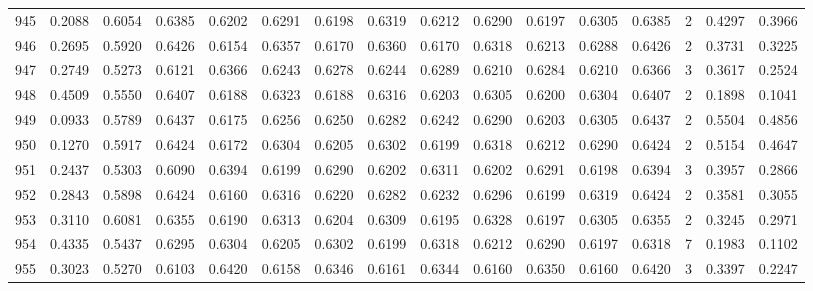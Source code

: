\begin{tabular}{lrrrrrrrrrrrrrrr}
945 &      0.2088 &  0.6054 &  0.6385 &  0.6202 &  0.6291 &  0.6198 &  0.6319 &  0.6212 &  0.6290 &  0.6197 &   0.6305 &     0.6385 &      2 &                    0.4297 &                     0.3966 \\
946 &      0.2695 &  0.5920 &  0.6426 &  0.6154 &  0.6357 &  0.6170 &  0.6360 &  0.6170 &  0.6318 &  0.6213 &   0.6288 &     0.6426 &      2 &                    0.3731 &                     0.3225 \\
947 &      0.2749 &  0.5273 &  0.6121 &  0.6366 &  0.6243 &  0.6278 &  0.6244 &  0.6289 &  0.6210 &  0.6284 &   0.6210 &     0.6366 &      3 &                    0.3617 &                     0.2524 \\
948 &      0.4509 &  0.5550 &  0.6407 &  0.6188 &  0.6323 &  0.6188 &  0.6316 &  0.6203 &  0.6305 &  0.6200 &   0.6304 &     0.6407 &      2 &                    0.1898 &                     0.1041 \\
949 &      0.0933 &  0.5789 &  0.6437 &  0.6175 &  0.6256 &  0.6250 &  0.6282 &  0.6242 &  0.6290 &  0.6203 &   0.6305 &     0.6437 &      2 &                    0.5504 &                     0.4856 \\
950 &      0.1270 &  0.5917 &  0.6424 &  0.6172 &  0.6304 &  0.6205 &  0.6302 &  0.6199 &  0.6318 &  0.6212 &   0.6290 &     0.6424 &      2 &                    0.5154 &                     0.4647 \\
951 &      0.2437 &  0.5303 &  0.6090 &  0.6394 &  0.6199 &  0.6290 &  0.6202 &  0.6311 &  0.6202 &  0.6291 &   0.6198 &     0.6394 &      3 &                    0.3957 &                     0.2866 \\
952 &      0.2843 &  0.5898 &  0.6424 &  0.6160 &  0.6316 &  0.6220 &  0.6282 &  0.6232 &  0.6296 &  0.6199 &   0.6319 &     0.6424 &      2 &                    0.3581 &                     0.3055 \\
953 &      0.3110 &  0.6081 &  0.6355 &  0.6190 &  0.6313 &  0.6204 &  0.6309 &  0.6195 &  0.6328 &  0.6197 &   0.6305 &     0.6355 &      2 &                    0.3245 &                     0.2971 \\
954 &      0.4335 &  0.5437 &  0.6295 &  0.6304 &  0.6205 &  0.6302 &  0.6199 &  0.6318 &  0.6212 &  0.6290 &   0.6197 &     0.6318 &      7 &                    0.1983 &                     0.1102 \\
955 &      0.3023 &  0.5270 &  0.6103 &  0.6420 &  0.6158 &  0.6346 &  0.6161 &  0.6344 &  0.6160 &  0.6350 &   0.6160 &     0.6420 &      3 &                    0.3397 &                     0.2247 \\

\end{tabular}
